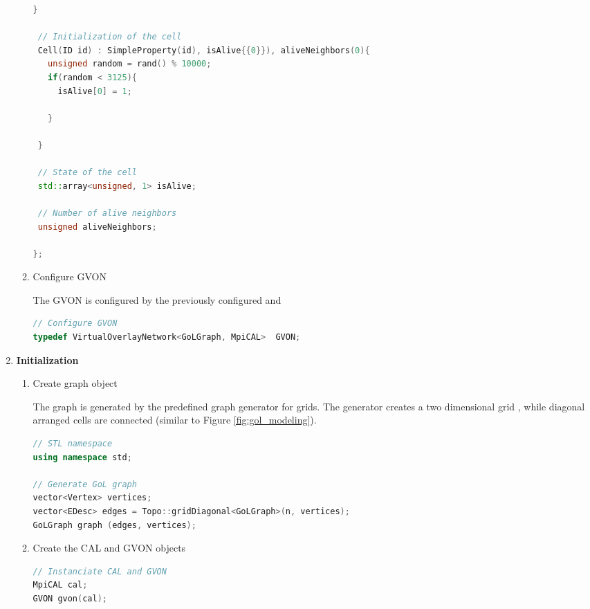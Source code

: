 \begin{enumerate}
\begin{enumerate}
\begin{lstlisting}[language=C++, label=lst:gol_cell, caption={}]
 }
        
 // Initialization of the cell
 Cell(ID id) : SimpleProperty(id), isAlive{{0}}), aliveNeighbors(0){ 
   unsigned random = rand() % 10000;
   if(random < 3125){ 
     isAlive[0] = 1;
     
   }
   
 }

 // State of the cell
 std::array<unsigned, 1> isAlive;

 // Number of alive neighbors
 unsigned aliveNeighbors;
 
};
\end{lstlisting}

\item Configure GVON

  The GVON is configured by the previously configured  and

  \begin{lstlisting}[language=C++, label=lst:conf_gvon, caption={}]
// Configure GVON
typedef VirtualOverlayNetwork<GoLGraph, MpiCAL>  GVON;
  \end{lstlisting}

\end{enumerate}

\item \textbf{Initialization}
  \begin{enumerate}
  
  \item Create graph object

    The graph is generated by the predefined graph generator for
    grids. The generator creates a two dimensional grid , while
    diagonal arranged cells are connected (similar to Figure
    \ref{fig:gol_modeling}).

  \begin{lstlisting}[language=C++, label=lst:gol_generator_graph, caption={}]
// STL namespace
using namespace std;

// Generate GoL graph
vector<Vertex> vertices;
vector<EDesc> edges = Topo::gridDiagonal<GoLGraph>(n, vertices);
GoLGraph graph (edges, vertices); 
  \end{lstlisting}

\item Create the CAL and GVON objects

  \begin{lstlisting}[language=C++, label=lst:, caption={}]
// Instanciate CAL and GVON
MpiCAL cal;
GVON gvon(cal);
  \end{lstlisting}


\end{enumerate}
\end{enumerate}
